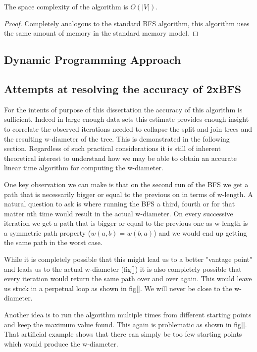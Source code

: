 \begin{lem} The space complexity of the algorithm is $O(|V|)$. \end{lem}

\begin{proof}
    Completely analogous to the standard BFS algorithm, this algorithm uses the same amount of memory in the standard memory model.
\end{proof}

\subsection{Dynamic Programming Approach}

\subsection{Attempts at resolving the accuracy of 2xBFS}

For the intents of purpose of this dissertation the accuracy of this algorithm is sufficient. Indeed in large enough data sets this estimate provides enough insight to correlate the observed iterations needed to collapse the split and join trees and the resulting w-diameter of the tree. This is demonstrated in the following section. Regardless of such practical considerations it is still of inherent theoretical interest to understand how we may be able to obtain an accurate linear time algorithm for computing the w-diameter.

One key observation we can make is that on the second run of the BFS we get a path that is necessarily bigger or equal to the previous on in terms of w-length. A natural question to ask is where running the BFS a third, fourth or for that matter nth time would result in the actual w-diameter. On every successive iteration we get a path that is bigger or equal to the previous one as w-length is a symmetric path property ($w(a, b) = w(b, a)$) and we would end up getting the same path in the worst case.

While it is completely possible that this might lead us to a better "vantage point" and leads us to the actual w-diameter (fig[]) it is also completely possible that every iteration would return the same path over and over again. This would leave us stuck in a perpetual loop as shown in fig[]. We will never be close to the w-diameter.

Another idea is to run the algorithm multiple times from different starting points and keep the maximum value found. This again is problematic as shown in fig[]. That artificial example shows that there can simply be too few starting points which would produce the w-diameter.

